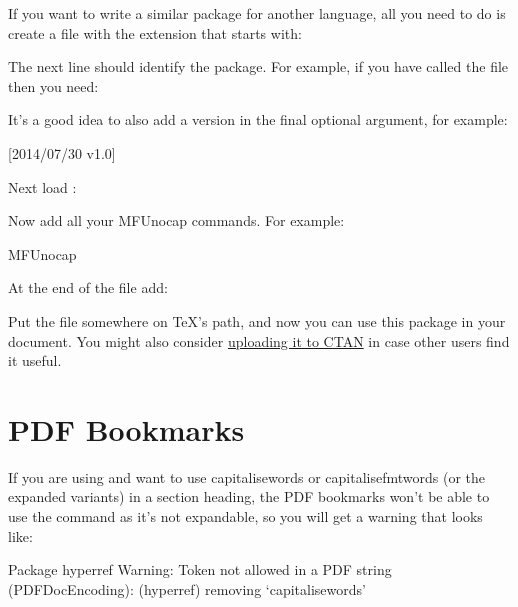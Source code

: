 \documentclass[titlepage=false,oneside,
 fontsize=12pt,captions=tableheading]{scrbook}
\begin{document}
If you want to write a similar package for another language, all you
need to do is create a file with the extension 
that starts with:
\begin{compactcodebox}
\end{compactcodebox}
The next line should identify the package. For example, if you have
called the file  then you need:
\begin{compactcodebox}
\end{compactcodebox}
It's a good idea to also add a version in the final optional
argument, for example:
\begin{compactcodebox}
[2014/07/30 v1.0]
\end{compactcodebox}
Next load :
\begin{compactcodebox}
\end{compactcodebox}
Now add all your \gls{MFUnocap} commands. For example:
\begin{compactcodebox}
\gls{MFUnocap}
\end{compactcodebox}
At the end of the file add:
\begin{compactcodebox}
\end{compactcodebox}

Put the file somewhere on \TeX's path, and now you can use this
package in your document. You might also consider
\href{http://ctan.org/upload}{uploading it to CTAN} in case
other users find it useful.


\section{PDF Bookmarks}
\label{sec:pdfbookmarks}

If you are using  and want to use
\gls{capitalisewords} or \gls{capitalisefmtwords} (or the expanded
variants) in a section heading, the PDF bookmarks won't be able to
use the command as it's not expandable, so you will get a warning
that looks like:
\begin{transcript}
Package hyperref Warning: Token not allowed in a PDF string 
(PDFDocEncoding):
(hyperref)                removing `\gls{capitalisewords}'
\end{transcript}
\end{document}
